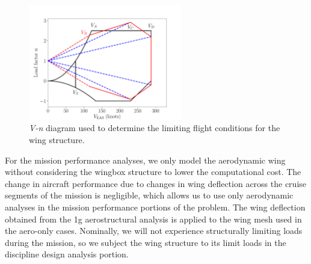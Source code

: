 \begin{figure}
\begin{center}
 \includegraphics[width=0.6\textwidth]{../Images/v_n_diagram}
 \caption{\textit{V-n} diagram used to determine the limiting flight conditions for the wing structure.}
 \label{f:v_n_diagram}
\end{center}
\end{figure}

For the mission performance analyses, we only model the aerodynamic wing without considering the wingbox structure to lower the computational cost.
The change in aircraft performance due to changes in wing deflection across the cruise segments of the mission is negligible, which allows us to use only aerodynamic analyses in the mission performance portions of the problem.
The wing deflection obtained from the 1g aerostructural analysis is applied to the wing mesh used in the aero-only cases.
Nominally, we will not experience structurally limiting loads during the mission, so we subject the wing structure to its limit loads in the discipline design analysis portion.
